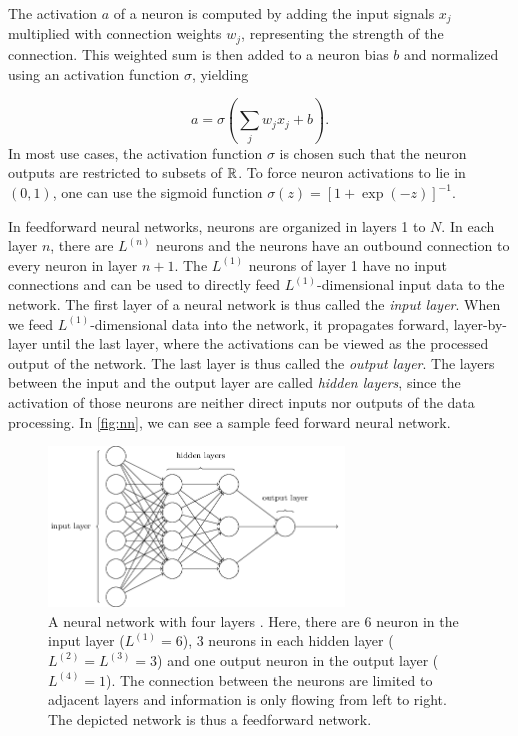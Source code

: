 The activation $a$ of a neuron is computed by adding the input signals $x_j$ multiplied with connection weights $w_j$, representing the strength of the connection. This weighted sum is then added to a neuron bias $b$ and normalized using an activation function $\sigma$, yielding

\begin{equation}
  a = \sigma\left(\sum_j w_j x_j + b\right).
\end{equation}
In most use cases, the activation function $\sigma$ is chosen such that the
neuron outputs are restricted to subsets of $\mathbb{R}$. To force neuron activations
to lie in $(0,1)$, one can use the sigmoid function
$\sigma(z) = [1+\exp(-z)]^{-1}$.

In feedforward neural networks, neurons are organized in layers 1 to $N$.
In each layer $n$, there are $L^{(n)}$ neurons and the neurons have an outbound connection to every neuron in layer $n+1$.
The $L^{(1)}$ neurons of layer 1 have no input connections and can be used to directly feed $L^{(1)}$-dimensional input data to the network.
The first layer of a neural network is thus called the \textit{input layer}.
When we feed $L^{(1)}$-dimensional data into the network, it propagates forward, layer-by-layer until the last layer, where the activations can be viewed as the processed output of the network. The last layer is thus called the \textit{output layer}.
The layers between the input and the output layer are called \textit{hidden layers}, since the activation of those neurons are neither direct inputs nor outputs of the data processing. In \autoref{fig:nn}, we can see a sample feed forward neural network.

\begin{figure}[H]
  \centering
  \includegraphics[width=0.7\textwidth]{media/network.png}
  \caption{A neural network with four layers \cite{nielsen}. Here, there are 6 neuron in the input layer ($L^{(1)} = 6$), 3 neurons in each hidden layer ($L^{(2)} = L^{(3)} = 3$) and one output neuron in the output layer ($L^{(4)}=1$). The connection between the neurons are limited to adjacent layers and information is only flowing from left to right. The depicted network is thus a feedforward network.}
  \label{fig:nn}
\end{figure}

